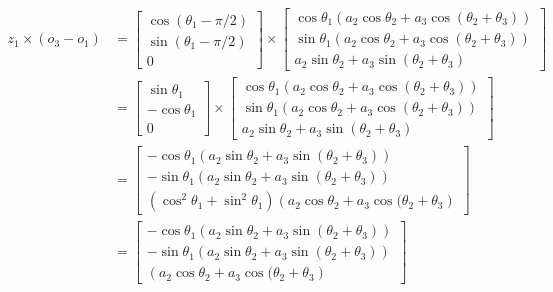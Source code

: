 \documentclass{article}
\begin{document}
\begin{align*}
z_1 \times (o_3 - o_1)
	& = \left[
		\begin{matrix} 
			\cos(\theta_1 - \pi/2) \\ \sin(\theta_1 - \pi/2) \\ 0 
		\end{matrix} \right]
	\times \left[ 
		\begin{matrix} 
			\cos \theta_1 (a_2 \cos \theta_2 + a_3 \cos ( \theta_2 + \theta_3))\\
			\sin \theta_1 (a_2 \cos \theta_2 + a_3 \cos ( \theta_2 + \theta_3))\\
			a_2 \sin \theta_2 + a_3 \sin (\theta_2 + \theta_3)
		\end{matrix} \right]\\
	& = \left[
		\begin{matrix} 
			\sin \theta_1 \\ - \cos \theta_1 \\ 0 
		\end{matrix} \right]
	\times \left[ 
		\begin{matrix} 
			\cos \theta_1 (a_2 \cos \theta_2 + a_3 \cos ( \theta_2 + \theta_3))\\
			\sin \theta_1 (a_2 \cos \theta_2 + a_3 \cos ( \theta_2 + \theta_3))\\
			a_2 \sin \theta_2 + a_3 \sin (\theta_2 + \theta_3)
		\end{matrix} \right]\\
	& = 
	\left[ 
		\begin{matrix} 
			- \cos \theta_1 
				\left(a_2 \sin \theta_2 + a_3 \sin (\theta_2 + \theta_3)\right)\\ 
			- \sin \theta_1 
				\left(a_2 \sin \theta_2 + a_3 \sin (\theta_2 + \theta_3)\right)\\ 
			\left(\cos^2 \theta_1 + \sin^2 \theta_1 \right)
				\left(a_2 \cos \theta_2 + a_3 \cos ( \theta_2 + \theta_3\right)
		\end{matrix} \right]\\
	& = 
	\left[ 
		\begin{matrix} 
			- \cos \theta_1 
				\left(a_2 \sin \theta_2 + a_3 \sin (\theta_2 + \theta_3)\right)\\ 
			- \sin \theta_1 
				\left(a_2 \sin \theta_2 + a_3 \sin (\theta_2 + \theta_3)\right)\\ 
			\left(a_2 \cos \theta_2 + a_3 \cos ( \theta_2 + \theta_3 \right)
		\end{matrix} \right]
\end{align*}
\end{document}
